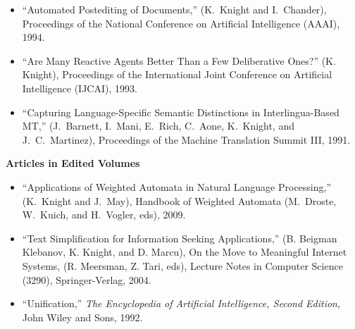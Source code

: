 \begin{itemize}
\item ``Automated Postediting of Documents,''
(K.~Knight and I.~Chander),
Proceedings of the National Conference on Artificial Intelligence (AAAI), 1994.

\item ``Are Many Reactive Agents Better Than a Few Deliberative Ones?''
(K. Knight),
Proceedings of the International Joint Conference on Artificial Intelligence (IJCAI), 1993.


\item ``Capturing Language-Specific Semantic Distinctions
in Interlingua-Based MT,'' (J.~Barnett, I.~Mani, E.~Rich, C.~Aone,
K.~Knight, and J.~C.~Martinez), Proceedings of the Machine Translation 
Summit III, 1991.


\end{itemize}

\noindent
{\bf Articles in Edited Volumes}
\begin{itemize}

\item ``Applications of Weighted Automata in Natural Language
Processing,'' (K.~Knight and J.~May), Handbook of Weighted
Automata (M.~Droste, W.~Kuich, and H.~Vogler, eds), 2009.

\item ``Text Simplification for Information Seeking Applications,''
(B. Beigman Klebanov, K. Knight, and D. Marcu), On the Move
to Meaningful Internet Systems, (R. Meersman, Z. Tari, eds),
Lecture Notes in Computer Science (3290), Springer-Verlag, 2004.

\item ``Unification,'' {\em The Encyclopedia of
Artificial Intelligence, Second Edition}, John Wiley and Sons, 1992.

\end{itemize}

